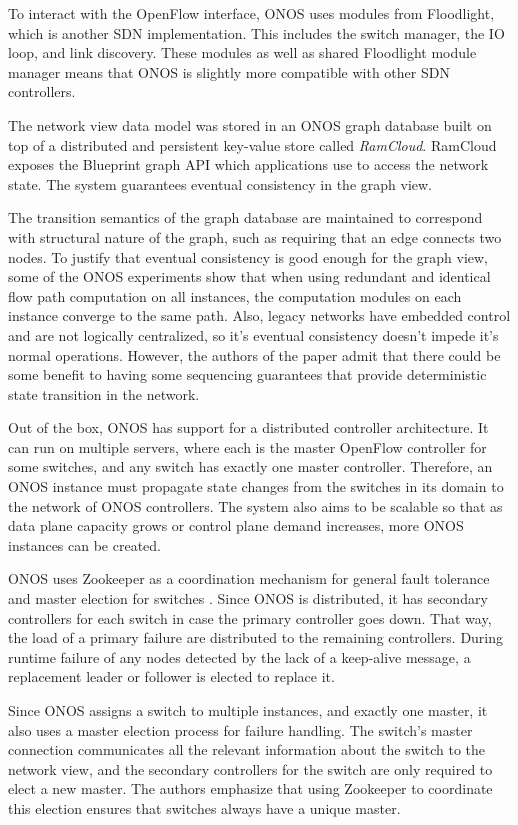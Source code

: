 \documentclass[letterpaper,twocolumn,10pt]{article}
\begin{document}
To interact with the OpenFlow interface, ONOS uses modules from Floodlight, which is another SDN implementation. This includes the switch manager, the IO loop, and link discovery. These modules as well as shared Floodlight module manager means that ONOS is slightly more compatible with other SDN controllers.

The network view data model was stored in an ONOS graph database built on top of a distributed and persistent key-value store called \emph{RamCloud}. RamCloud exposes the Blueprint graph API which applications use to access the network state. The system guarantees eventual consistency in the graph view.\cite{berde2014onos} 

The transition semantics of the graph database are maintained to correspond with structural nature of the graph, such as requiring that an edge connects two nodes. To justify that eventual consistency is good enough for the graph view, some of the ONOS experiments show that when using redundant and identical flow path computation on all instances, the computation modules on each instance converge to the same path. Also, legacy networks have embedded control and are not logically centralized, so it's eventual consistency doesn't impede it's normal operations. However, the authors of the paper admit that there could be some benefit to having some sequencing guarantees that provide deterministic state transition in the network.

Out of the box, ONOS has support for a distributed controller architecture. It can run on multiple servers, where each is the master OpenFlow controller for some switches, and any switch has exactly one master controller. Therefore, an ONOS instance must propagate state changes from the switches in its domain to the network of ONOS controllers. The system also aims to be scalable so that as data plane capacity grows or control plane demand increases, more ONOS instances can be created.

ONOS uses Zookeeper as a coordination mechanism for general fault tolerance and master election for switches \cite{hunt2010zookeeper}. Since ONOS is distributed, it has secondary controllers for each switch in case the primary controller goes down. That way, the load of a primary failure are distributed to the remaining controllers. During runtime failure of any nodes detected by the lack of a keep-alive message, a replacement leader or follower is elected to replace it.

Since ONOS assigns a switch to multiple instances, and exactly one master, it also uses a master election process for failure handling. The switch's master connection communicates all the relevant information about the switch to the network view, and the secondary controllers for the switch are only required to elect a new master. The authors emphasize that using Zookeeper to coordinate this election ensures that switches always have a unique master. 
\end{document}
